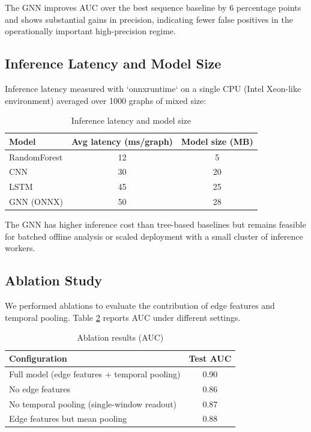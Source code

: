 \documentclass[conference]{IEEEtran}
\begin{document}
The GNN improves AUC over the best sequence baseline by 6 percentage points and shows substantial gains in precision, indicating fewer false positives in the operationally important high-precision regime.

\subsection{Inference Latency and Model Size}

Inference latency measured with `onnxruntime` on a single CPU (Intel Xeon-like environment) averaged over 1000 graphs of mixed size:

\begin{table}[ht]
\caption{Inference latency and model size}
\label{tab:latency}
\centering
\begin{tabular}{|l|c|c|}
\hline
Model & Avg latency (ms/graph) & Model size (MB) \\
\hline
RandomForest & 12 & 5 \\
CNN & 30 & 20 \\
LSTM & 45 & 25 \\
GNN (ONNX) & 50 & 28 \\
\hline
\end{tabular}
\end{table}

The GNN has higher inference cost than tree-based baselines but remains feasible for batched offline analysis or scaled deployment with a small cluster of inference workers.

\subsection{Ablation Study}

We performed ablations to evaluate the contribution of edge features and temporal pooling. Table \ref{tab:ablation} reports AUC under different settings.

\begin{table}[ht]
\caption{Ablation results (AUC)}
\label{tab:ablation}
\centering
\begin{tabular}{|l|c|}
\hline
Configuration & Test AUC \\
\hline
Full model (edge features + temporal pooling) & 0.90 \\
No edge features & 0.86 \\
No temporal pooling (single-window readout) & 0.87 \\
Edge features but mean pooling & 0.88 \\
\hline
\end{tabular}
\end{table}
\end{document}

